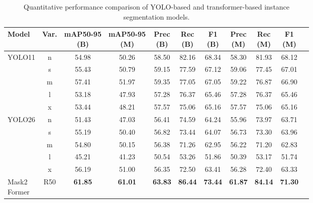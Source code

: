 \documentclass[runningheads]{llncs}
\begin{document}
\begin{table}[t]
\centering
\caption{Quantitative performance comparison of YOLO-based and transformer-based instance segmentation models.}
\label{tab:benchmark_performance}
\setlength{\tabcolsep}{3.2pt}
\renewcommand{\arraystretch}{1.05}
\small
\begin{tabular}{lcccccccccc}
\hline
Model & Var. & \makecell{mAP50-95\\(B)} & \makecell{mAP50-95\\(M)} & \makecell{Prec\\(B)} & \makecell{Rec\\(B)} & \makecell{F1\\(B)} & \makecell{Prec\\(M)} & \makecell{Rec\\(M)} & \makecell{F1\\(M)} \\
\hline

\multirow{5}{*}{YOLO11} 
& n & 54.98 & 50.26 & 58.50 & 82.16 & 68.34 & 58.30 & 81.93 & 68.12 \\
& s & 55.43 & 50.79 & 59.15 & 77.59 & 67.12 & 59.06 & 77.45 & 67.01 \\
& m & 57.41 & 51.97 & 59.35 & 77.05 & 67.05 & 59.22 & 76.87 & 66.90 \\
& l & 53.18 & 47.93 & 57.28 & 76.37 & 65.46 & 57.28 & 76.37 & 65.46 \\
& x & 53.44 & 48.21 & 57.57 & 75.06 & 65.16 & 57.57 & 75.06 & 65.16 \\

\hline

\multirow{5}{*}{YOLO26} 
& n & 51.43 & 47.03 & 56.41 & 74.59 & 64.24 & 55.96 & 73.97 & 63.71 \\
& s & 55.19 & 50.40 & 56.82 & 73.44 & 64.07 & 56.73 & 73.30 & 63.96 \\
& m & 54.80 & 50.15 & 56.38 & 71.26 & 62.95 & 56.22 & 71.20 & 62.83 \\
& l & 45.21 & 41.23 & 50.54 & 53.26 & 51.86 & 50.39 & 53.17 & 51.74 \\
& x & 56.19 & 51.00 & 56.35 & 72.50 & 63.41 & 56.28 & 72.40 & 63.33 \\

\hline

\makecell{Mask2\\Former} & R50 & \textbf{61.85} & \textbf{61.01} & \textbf{63.83} & \textbf{86.44} & \textbf{73.44} & \textbf{61.87} & \textbf{84.14} & \textbf{71.30} \\

\hline
\end{tabular}
\end{table}
\end{document}
